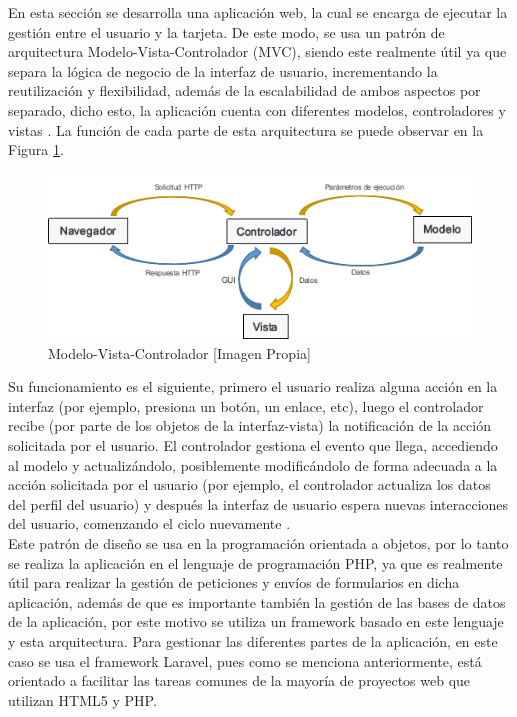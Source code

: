 En esta sección se desarrolla una aplicación web, la cual se encarga de ejecutar la gestión entre el usuario y la tarjeta. De este modo, se usa un patrón de arquitectura Modelo-Vista-Controlador (MVC), siendo este realmente útil ya que separa la lógica de negocio de la interfaz de usuario, incrementando la reutilización y flexibilidad, además de la escalabilidad de ambos aspectos por separado, dicho esto, la aplicación cuenta con diferentes modelos, controladores y vistas \cite{MVC1}. La función de cada parte de esta arquitectura se puede observar en la Figura \ref{fig:mvc}.\\

\begin{figure}[H]
	\centering
	\caption{Modelo-Vista-Controlador [Imagen Propia]}
	\label{fig:mvc}
	\includegraphics[width=0.7\linewidth]{Imagenes/MVC}
\end{figure}


Su funcionamiento es el siguiente, primero el usuario realiza alguna acción en la interfaz (por ejemplo, presiona un botón, un enlace, etc), luego el controlador recibe (por parte de los objetos de la interfaz-vista) la notificación de la acción solicitada por el usuario. El controlador gestiona el evento que llega, accediendo al modelo y actualizándolo, posiblemente modificándolo de forma adecuada a la acción solicitada por el usuario (por ejemplo, el controlador actualiza los datos del perfil del usuario) y después la interfaz de usuario espera nuevas interacciones del usuario, comenzando el ciclo nuevamente \cite{MVC2}.\\

Este patrón de diseño se usa en la programación orientada a objetos, por lo tanto se realiza la aplicación en el lenguaje de programación PHP, ya que es realmente útil para realizar la gestión de peticiones y envíos de formularios en dicha aplicación, además de que es importante también la gestión de las bases de datos de la aplicación, por este motivo se utiliza un framework basado en este lenguaje y esta arquitectura. Para gestionar las diferentes partes de la aplicación, en este caso se usa el framework Laravel, pues como se menciona anteriormente, está orientado a facilitar las tareas comunes de la mayoría de proyectos web que utilizan HTML5 y PHP.\\

